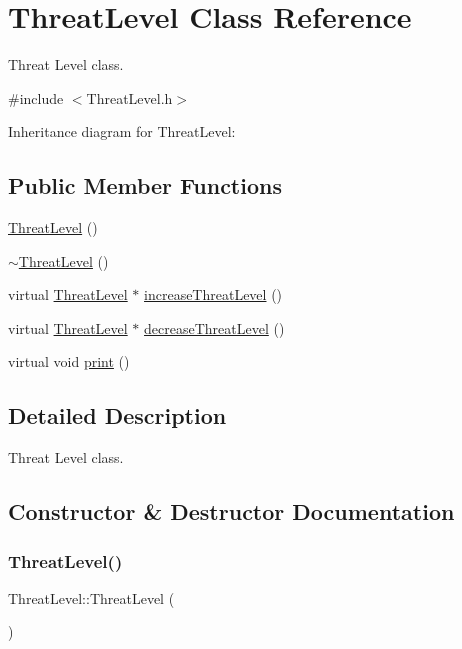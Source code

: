 \hypertarget{classThreatLevel}{}\section{Threat\+Level Class Reference}
\label{classThreatLevel}


Threat Level class.  




{\ttfamily \#include $<$Threat\+Level.\+h$>$}



Inheritance diagram for Threat\+Level\+:
\subsection*{Public Member Functions}
\begin{DoxyCompactItemize}
\item 
\hyperlink{classThreatLevel_a18dc853a3ac3b4db9ec7495dae72f8fb}{Threat\+Level} ()
\item 
\hyperlink{classThreatLevel_ad69b03a01e63cffeca7656155d4e0849}{$\sim$\+Threat\+Level} ()
\item 
virtual \hyperlink{classThreatLevel}{Threat\+Level} $\ast$ \hyperlink{classThreatLevel_ae18f6ebe2186ae1b61d4817196f969e3}{increase\+Threat\+Level} ()
\item 
virtual \hyperlink{classThreatLevel}{Threat\+Level} $\ast$ \hyperlink{classThreatLevel_a3545ec161fbe4c01beafb9b43624c7e8}{decrease\+Threat\+Level} ()
\item 
virtual void \hyperlink{classThreatLevel_a5bdff5eeffed8db616ca06091097c138}{print} ()
\end{DoxyCompactItemize}


\subsection{Detailed Description}
Threat Level class. 

\subsection{Constructor \& Destructor Documentation}
\mbox{\label{classThreatLevel_a18dc853a3ac3b4db9ec7495dae72f8fb}} 
\subsubsection{\texorpdfstring{Threat\+Level()}{ThreatLevel()}}
{\footnotesize\ttfamily Threat\+Level\+::\+Threat\+Level (\begin{DoxyParamCaption}{ }\end{DoxyParamCaption})\hspace{0.3cm}{\ttfamily [inline]}}

